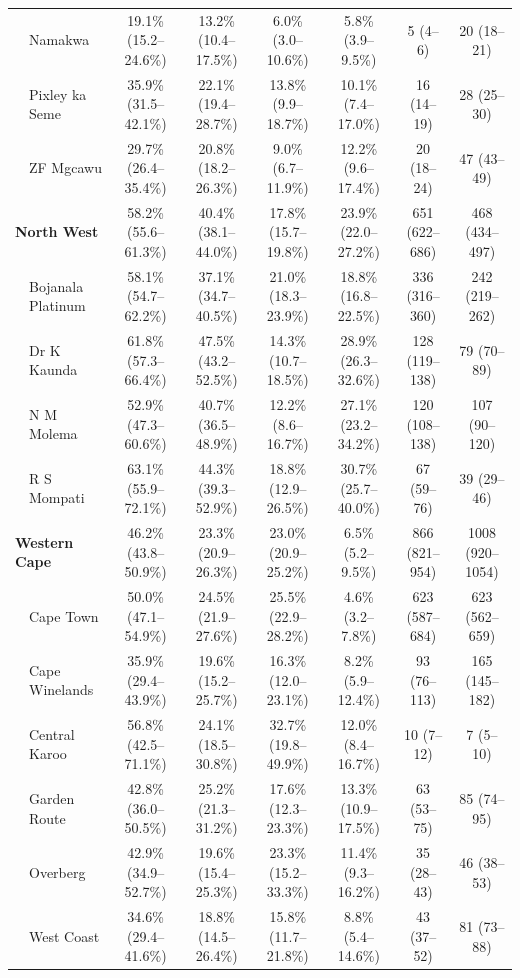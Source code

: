 \documentclass{article}
\begin{document}
\begin{landscape}
{\begin{longtable}[c]{llc cc ccc}
      & Namakwa & 19.1\% (15.2--24.6\%) & 13.2\% (10.4--17.5\%) & 6.0\% (3.0--10.6\%) & 5.8\% (3.9--9.5\%) & 5 (4--6) & 20 (18--21) \\
      & Pixley ka Seme & 35.9\% (31.5--42.1\%) & 22.1\% (19.4--28.7\%) & 13.8\% (9.9--18.7\%) & 10.1\% (7.4--17.0\%) & 16 (14--19) & 28 (25--30) \\
      & ZF Mgcawu & 29.7\% (26.4--35.4\%) & 20.8\% (18.2--26.3\%) & 9.0\% (6.7--11.9\%) & 12.2\% (9.6--17.4\%) & 20 (18--24) & 47 (43--49) \\[5pt]
      \multicolumn{2}{l}{\textbf{North West}} & 58.2\% (55.6--61.3\%) & 40.4\% (38.1--44.0\%) & 17.8\% (15.7--19.8\%) & 23.9\% (22.0--27.2\%) & 651 (622--686) & 468 (434--497) \\
      & Bojanala Platinum & 58.1\% (54.7--62.2\%) & 37.1\% (34.7--40.5\%) & 21.0\% (18.3--23.9\%) & 18.8\% (16.8--22.5\%) & 336 (316--360) & 242 (219--262) \\
      & Dr K Kaunda & 61.8\% (57.3--66.4\%) & 47.5\% (43.2--52.5\%) & 14.3\% (10.7--18.5\%) & 28.9\% (26.3--32.6\%) & 128 (119--138) & 79 (70--89) \\
      & N M Molema & 52.9\% (47.3--60.6\%) & 40.7\% (36.5--48.9\%) & 12.2\% (8.6--16.7\%) & 27.1\% (23.2--34.2\%) & 120 (108--138) & 107 (90--120) \\
      & R S Mompati & 63.1\% (55.9--72.1\%) & 44.3\% (39.3--52.9\%) & 18.8\% (12.9--26.5\%) & 30.7\% (25.7--40.0\%) & 67 (59--76) & 39 (29--46) \\[5pt]
      \multicolumn{2}{l}{\textbf{Western Cape}} & 46.2\% (43.8--50.9\%) & 23.3\% (20.9--26.3\%) & 23.0\% (20.9--25.2\%) & 6.5\% (5.2--9.5\%) & 866 (821--954) & 1008 (920--1054) \\
      & Cape Town & 50.0\% (47.1--54.9\%) & 24.5\% (21.9--27.6\%) & 25.5\% (22.9--28.2\%) & 4.6\% (3.2--7.8\%) & 623 (587--684) & 623 (562--659) \\
      & Cape Winelands & 35.9\% (29.4--43.9\%) & 19.6\% (15.2--25.7\%) & 16.3\% (12.0--23.1\%) & 8.2\% (5.9--12.4\%) & 93 (76--113) & 165 (145--182) \\
      & Central Karoo & 56.8\% (42.5--71.1\%) & 24.1\% (18.5--30.8\%) & 32.7\% (19.8--49.9\%) & 12.0\% (8.4--16.7\%) & 10 (7--12) & 7 (5--10) \\
      & Garden Route & 42.8\% (36.0--50.5\%) & 25.2\% (21.3--31.2\%) & 17.6\% (12.3--23.3\%) & 13.3\% (10.9--17.5\%) & 63 (53--75) & 85 (74--95) \\
      & Overberg & 42.9\% (34.9--52.7\%) & 19.6\% (15.4--25.3\%) & 23.3\% (15.2--33.3\%) & 11.4\% (9.3--16.2\%) & 35 (28--43) & 46 (38--53) \\
      & West Coast & 34.6\% (29.4--41.6\%) & 18.8\% (14.5--26.4\%) & 15.8\% (11.7--21.8\%) & 8.8\% (5.4--14.6\%) & 43 (37--52) & 81 (73--88) 
      \label{tab:results}
  \end{longtable}
  }
\end{landscape}
\end{document}
